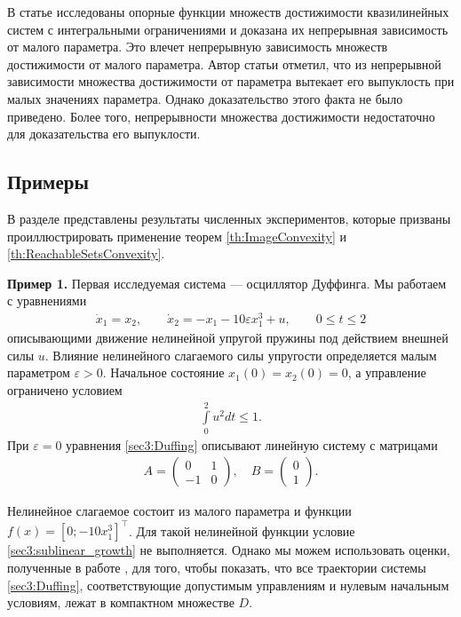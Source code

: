 \documentclass[../main.tex]{subfiles}
\begin{document}
\begin{zam} 
 В статье \cite{Albrecht2} исследованы опорные функции множеств достижимости квазилинейных систем с интегральными ограничениями и доказана их непрерывная зависимость от малого параметра.
 Это влечет непрерывную зависимость множеств достижимости от малого параметра. 
 Автор статьи отметил, что из непрерывной зависимости множества достижимости от параметра вытекает его выпуклость при малых значениях параметра.
 Однако доказательство этого факта не было приведено. 
 Более того, непрерывности множества достижимости недостаточно для доказательства его выпуклости.
\end{zam}

\subsection{Примеры}
\label{sec3:examples}
В разделе представлены результаты численных экспериментов, которые призваны проиллюстрировать применение теорем \ref{th:ImageConvexity} и \ref{th:ReachableSetsConvexity}. 

\textbf{Пример 1.}
 Первая исследуемая система --- осциллятор Дуффинга. 
 Мы работаем с уравнениями
 \begin{gather}\label{sec3:Duffing}
 \dot{x}_1 = x_2, \qquad
 \dot{x}_2 = -x_1 - 10 \varepsilon x_1^3 + u,\qquad 0\leqslant t \leqslant 2
 \end{gather}
 описывающими движение нелинейной упругой пружины под действием внешней силы $u$. 
 Влияние нелинейного слагаемого силы упругости определяется малым параметром $\varepsilon > 0$. 
Начальное состояние $x_1(0) = x_2(0) = 0 $, а управление ограничено условием
 \begin{gather}\label{Duffing_controls}
 \int\limits_0^2u^2dt \leqslant 1.
 \end{gather}
 При $\varepsilon = 0$ уравнения \eqref{sec3:Duffing} описывают линейную систему с матрицами 
 \begin{gather*}
 A = \begin{pmatrix} 0 & 1\\
 -1 & 0
 \end{pmatrix}, \quad B = \begin{pmatrix}
 0\\
 1
 \end{pmatrix}.
 \end{gather*}
 
 Нелинейное слагаемое состоит из малого параметра и функции $f(x) = [0;-10x_1^3]^{\top}$. 
 Для такой нелинейной функции условие \eqref{sec3:sublinear_growth} не выполняется. 
 Однако мы можем использовать оценки, полученные в работе \cite{Zykov2019}, для того, чтобы показать, что все траектории системы \eqref{sec3:Duffing}, соответствующие допустимым управлениям и нулевым начальным условиям, лежат в компактном множестве $D$. 
 
\end{document}
